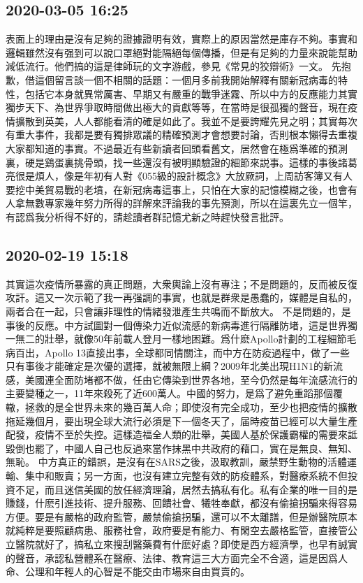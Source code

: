 \documentclass[twocolumn]{ctexart}
\begin{document}
\subsection*{2020-03-05 16:25}

表面上的理由是沒有足夠的證據證明有效，實際上的原因當然是庫存不夠。事實和邏輯雖然沒有强到可以說口罩絕對能隔絕每個傳播，但是有足夠的力量來說能幫助減低流行。他們搞的這是律師玩的文字游戲，參見《常見的狡辯術》一文。
先抱歉，借這個留言談一個不相關的話題：一個月多前我開始解釋有關新冠病毒的特性，包括它本身就異常厲害、早期又有嚴重的戰爭迷霧、所以中方的反應能力其實獨步天下、為世界爭取時間做出極大的貢獻等等，在當時是很孤獨的聲音，現在疫情擴散到英美，人人都能看清的確是如此了。我並不是要誇耀先見之明；其實每次有重大事件，我都是要有獨排眾議的精確預測才會想要討論，否則根本懶得去重複大家都知道的事實。不過最近有些新讀者回頭看舊文，居然會在極爲準確的預測裏，硬是鷄蛋裏挑骨頭，找一些還沒有被明顯驗證的細節來説事。這樣的事後諸葛亮很是煩人，像是年初有人對《055級的設計概念》大放厥詞，上周訪客簿又有人要挖中美貿易戰的老墳，在新冠病毒這事上，只怕在大家的記憶模糊之後，也會有人拿無數專家幾年努力所得的詳解來評論我的事先預測，所以在這裏先立一個竿，有認爲我分析得不好的，請趁讀者群記憶尤新之時趕快發言批評。
\subsection*{2020-02-19 15:18}

其實這次疫情所暴露的真正問題，大衆輿論上沒有專注；不是問題的，反而被反復攻訐。這又一次示範了我一再强調的事實，也就是群衆是愚蠢的，媒體是自私的，兩者合在一起，只會讓非理性的情緒發泄產生共鳴而不斷放大。
不是問題的，是事後的反應。中方試圖對一個傳染力近似流感的新病毒進行隔離防堵，這是世界獨一無二的壯舉，就像50年前載人登月一樣地困難。爲什麽Apollo計劃的工程細節毛病百出，Apollo 13直接出事，全球都同情關注，而中方在防疫過程中，做了一些只有事後才能確定是次優的選擇，就被無限上綱？2009年北美出現H1N1的新流感，美國連全面防堵都不做，任由它傳染到世界各地，至今仍然是每年流感流行的主要變種之一，11年來殺死了近600萬人。中國的努力，是爲了避免重蹈那個覆轍，拯救的是全世界未來的幾百萬人命；即使沒有完全成功，至少也把疫情的擴散拖延幾個月，要出現全球大流行必須是下一個冬天了，届時疫苗已經可以大量生產配發，疫情不至於失控。這樣造福全人類的壯舉，美國人基於保護霸權的需要來詆毀倒也罷了，中國人自己也反過來當作抹黑中共政府的藉口，實在是無良、無知、無恥。
中方真正的錯誤，是沒有在SARS之後，汲取教訓，嚴禁野生動物的活體運輸、集中和販賣；另一方面，也沒有建立完整有效的防疫體系，對醫療系統不但投資不足，而且迷信美國的放任經濟理論，居然去搞私有化。私有企業的唯一目的是賺錢，什麽引進技術、提升服務、回饋社會、犧牲奉獻，都沒有偷搶拐騙來得容易方便。要是有嚴格的政府監管，嚴禁偷搶拐騙，還可以不太離譜，但是辦醫院原本就純粹是要照顧病患、服務社會，政府要是有能力、有閑空去嚴格監管，直接管公立醫院就好了，搞私立來搜刮醫藥費有什麽好處？即使是西方經濟學，也早有誠實的聲音，承認私營體系在醫療、法律、教育這三大方面完全不合適，這是因爲人命、公理和年輕人的心智是不能交由市場來自由買賣的。
\end{document}
